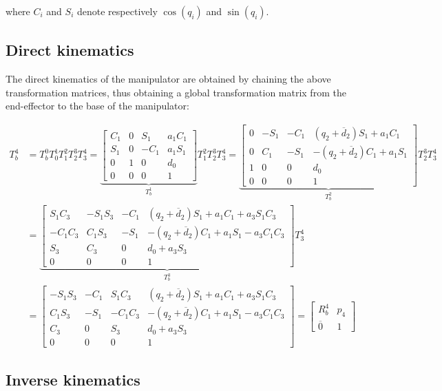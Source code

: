 where $C_i$ and $S_i$ denote respectively $\cos(q_i)$ and $\sin(q_i)$.

\subsection{Direct kinematics}

The direct kinematics of the manipulator are obtained by chaining the above transformation matrices, thus obtaining a global transformation matrix from the end-effector to the base of the manipulator:

\begin{align*}
T_b^4&=T_b^0T_0^1T_1^2T_2^3T_3^4=\underset{T_b^1}{\underbrace{\begin{bmatrix}
C_1&0&S_1&a_1C_1\\
S_1&0&-C_1&a_1S_1\\
0&1&0&d_0\\
0&0&0&1
\end{bmatrix}}}T_1^2T_2^3T_3^4=\underset{T_b^2}{\underbrace{\begin{bmatrix}
0 & -S_1&-C_1&(q_2+\overline d_2)S_1+a_1C_1\\
0 & C_1&-S_1&-(q_2+\overline d_2)C_1+a_1S_1\\
1 & 0 & 0 & d_0\\
0&0&0&1
\end{bmatrix}}}T_2^3T_3^4\\
&=\underset{T_b^3}{\underbrace{\begin{bmatrix}
S_1C_3&-S_1S_3&-C_1&(q_2+\overline d_2)S_1+a_1C_1+a_3S_1C_3\\
-C_1C_3&C_1S_3&-S_1&-(q_2+\overline d_2)C_1+a_1S_1-a_3C_1C_3\\
S_3&C_3&0&d_0+a_3S_3\\
0&0&0&1
\end{bmatrix}}}T_3^4\\
&=\begin{bmatrix}
-S_1S_3 & -C_1 & S_1C_3 & (q_2+\overline d_2)S_1+a_1C_1+a_3S_1C_3\\
C_1S_3 & -S_1 & -C_1C_3 & -(q_2+\overline d_2)C_1+a_1S_1-a_3C_1C_3\\
C_3 & 0 & S_3 &d_0+a_3S_3\\
0&0&0&1 
\end{bmatrix} =\begin{bmatrix}
R_b^{4}&p_{4}\\
\overline 0 & 1
\end{bmatrix}
\end{align*}

\subsection{Inverse kinematics}

